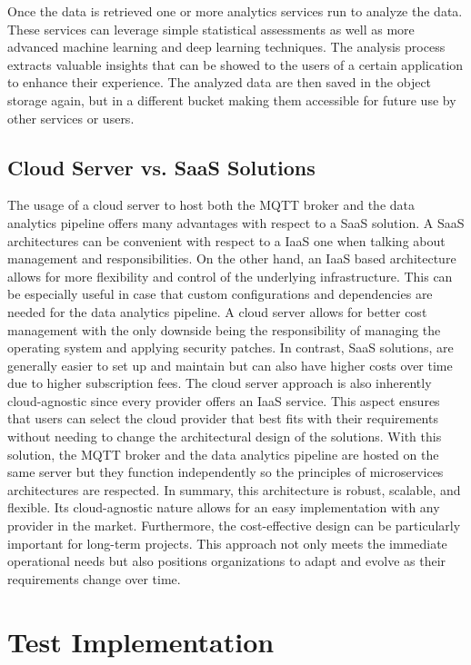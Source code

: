 Once the data is retrieved one or more analytics services run to analyze the data. These services can leverage simple statistical assessments as well as more advanced machine learning and deep learning techniques.
The analysis process extracts valuable insights that can be showed to the users of a certain application to enhance their experience. 
The analyzed data are then saved in the object storage again, but in a different bucket making them accessible for future use by other services or users.

\subsection{Cloud Server vs. SaaS Solutions}

The usage of a cloud server to host both the MQTT broker and the data analytics pipeline offers many advantages with respect to a SaaS solution.
A SaaS architectures can be convenient with respect to a IaaS one when talking about management and responsibilities. On the other hand, an IaaS based architecture allows for more flexibility and control of the underlying infrastructure. This can be especially useful in case that custom configurations and dependencies are needed for the data analytics pipeline.
A cloud server allows for better cost management with the only downside being the responsibility of managing the operating system and applying security patches. In contrast, SaaS solutions, are generally easier to set up and maintain but can also have higher costs over time due to higher subscription fees.
The cloud server approach is also inherently cloud-agnostic since every provider offers an IaaS service. This aspect ensures that users can select the cloud provider that best fits with their requirements without needing to change the architectural design of the solutions. With this solution, the MQTT broker and the data analytics pipeline are hosted on the same server but they function independently so the principles of microservices architectures are respected.
In summary, this architecture is robust, scalable, and flexible. Its cloud-agnostic nature allows for an easy implementation with any provider in the market. Furthermore, the cost-effective design can be particularly important for long-term projects. This approach not only meets the immediate operational needs but also positions organizations to adapt and evolve as their requirements change over time.

\section{Test Implementation}

